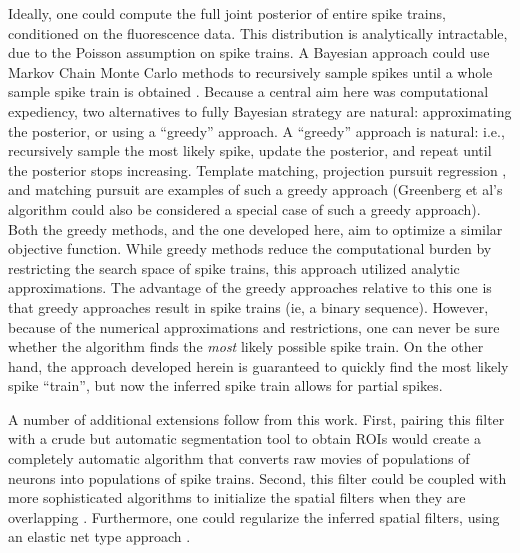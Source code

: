 Ideally, one could compute the full joint posterior of entire spike trains, conditioned on the fluorescence data.  This distribution is analytically intractable, due to the Poisson assumption on spike trains.  A Bayesian approach could use Markov Chain Monte Carlo methods to recursively sample spikes until a whole sample spike train is obtained \cite{AndrieuDoucet01,MishchenkoPaninski09,JouclaPouzat10}.  Because a central aim here was computational expediency, two alternatives to fully Bayesian strategy are natural: approximating the posterior, or using a ``greedy'' approach. A ``greedy'' approach is natural: i.e.,  recursively sample the most likely spike, update the posterior, and repeat until the posterior stops increasing.  Template matching, projection pursuit regression \cite{FS81}, and matching pursuit \cite{MallatZhang93} are examples of such a greedy approach (Greenberg et al's algorithm \cite{GreenbergKerr08} could also be considered a special case of such a greedy approach).  Both the greedy methods, and the one developed here, aim to optimize a similar objective function.  While greedy methods reduce the computational burden by restricting the search space of spike trains, this approach utilized analytic approximations.  The advantage of the greedy approaches relative to this one is that greedy approaches result in spike trains (ie, a binary sequence).  However, because of the numerical approximations and restrictions, one can never be sure whether the algorithm finds the \emph{most} likely possible spike train.  On the other hand, the approach developed herein is guaranteed to quickly find the most likely spike ``train'', but now the inferred spike train allows for partial spikes.  

A number of additional extensions follow from this work.  First, pairing this filter with a crude but automatic segmentation tool to obtain ROIs would create a completely automatic algorithm that converts raw movies of populations of neurons into populations of spike trains.  Second, this filter could be coupled with more sophisticated algorithms to initialize the spatial filters when they are overlapping  \cite{MukamelSchnitzer09}. Furthermore, one could regularize the inferred spatial filters, using an elastic net type approach \cite{ZouHastie05,GrosenickSmith09}.


